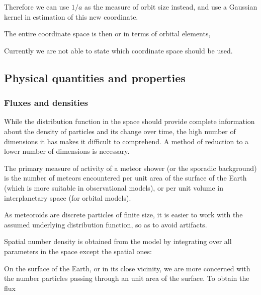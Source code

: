             Therefore we can use $1/a$ as the measure of orbit size instead,
            and use a Gaussian kernel in estimation of this new coordinate.

            The entire coordinate space is then
            or in terms of orbital elements,

            Currently we are not able to state which coordinate space should be used.

    \subsection{Physical quantities and properties} \label{mp}
        \subsubsection{Fluxes and densities} \label{msmf}
            While the distribution function in the space should provide complete information
            about the density of particles and its change over time,
            the high number of dimensions it has makes it difficult to comprehend.
            A method of reduction to a lower number of dimensions is necessary.

            The primary measure of activity of a meteor shower (or the sporadic background) is the number
            of meteors encountered per unit area of the surface of the Earth (which is more suitable
            in observational models), or per unit volume in interplanetary space (for orbital models).

            As meteoroids are discrete particles of finite size, it is easier to work with the
            assumed underlying distribution function, so as to avoid artifacts.

            Spatial number density is obtained from the model by integrating over all parameters
            in the space except the spatial ones:

            On the surface of the Earth, or in its close vicinity, we are more concerned with
            the number particles passing through an unit area of the surface.
            To obtain the flux

